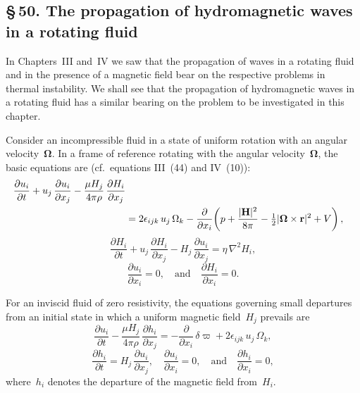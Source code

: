 
\subsection*{\S\,50. The propagation of hydromagnetic waves in a rotating fluid}

In Chapters~III and~IV we saw that the propagation of waves in a
rotating fluid and in the presence of a magnetic field bear on the respective
problems in thermal instability.  We shall see that the propagation
of hydromagnetic waves in a rotating fluid has a similar bearing on the
problem to be investigated in this chapter.

Consider an incompressible fluid in a state of uniform rotation with
an angular velocity~$\boldsymbol{\Omega}$.  In a frame of reference rotating with the angular
velocity~$\boldsymbol{\Omega}$, the basic equations are (cf.\ equations III~(44) and IV~(10)):
\begin{align}
  \frac{\partial u_i}{\partial t}
  + u_j\,\frac{\partial u_i}{\partial x_j}
  - \frac{\mu H_j}{4\pi\rho}\,\frac{\partial H_i}{\partial x_j}
  \notag\\
  &= 2\epsilon_{ijk}\,u_j\,\Omega_k
    - \frac{\partial}{\partial x_i}\!\left(
        p + \frac{|\mathbf{H}|^{2}}{8\pi}
        - \tfrac{1}{2}|\boldsymbol{\Omega}\times\mathbf{r}|^{2} + V
    \right),
  \label{eq:5-1}
\end{align}
\begin{equation}
  \frac{\partial H_i}{\partial t}
  + u_j\,\frac{\partial H_i}{\partial x_j}
  - H_j\,\frac{\partial u_i}{\partial x_j}
  = \eta\,\nabla^{2}H_i,
  \label{eq:5-2}
\end{equation}
\begin{equation}
  \frac{\partial u_i}{\partial x_i} = 0,
  \quad\text{and}\quad
  \frac{\partial H_i}{\partial x_i} = 0.
  \label{eq:5-3}
\end{equation}

For an inviscid fluid of zero resistivity, the equations governing small
departures from an initial state in which a uniform magnetic field~$H_j$
prevails are
\begin{equation}
  \frac{\partial u_i}{\partial t}
  - \frac{\mu H_j}{4\pi\rho}\,\frac{\partial h_i}{\partial x_j}
  = -\frac{\partial}{\partial x_i}\,\delta\varpi
    + 2\epsilon_{ijk}\,u_j\,\Omega_k,
  \label{eq:5-4}
\end{equation}
\begin{equation}
  \frac{\partial h_i}{\partial t}
  = H_j\,\frac{\partial u_i}{\partial x_j},
  \quad
  \frac{\partial u_i}{\partial x_i} = 0,
  \quad\text{and}\quad
  \frac{\partial h_i}{\partial x_i} = 0,
  \label{eq:5-5}
\end{equation}
where~$h_i$ denotes the departure of the magnetic field from~$H_i$.

